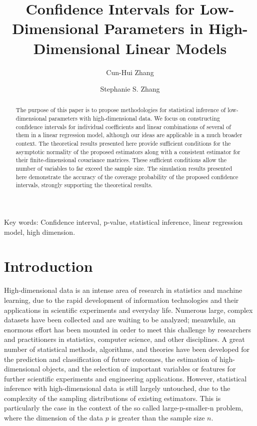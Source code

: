 \documentclass[11pt]{amsart}
\begin{document}
\title{Confidence Intervals for Low-Dimensional Parameters in High-Dimensional Linear Models} %
\author{Cun-Hui Zhang}
\address{Department of Statistics and Biostatistics, Hill Center, Busch Campus, 
Rutgers University, Piscataway, NJ 08854, USA}
\author{Stephanie S. Zhang}\address{Department of Statistics, Columbia University, 
New York, NY 10027}

\begin{abstract}
The purpose of this paper is to propose methodologies for statistical inference of low-dimensional 
parameters with high-dimensional data.  We focus on constructing confidence intervals for 
individual coefficients and linear combinations of several of them in a linear regression model, although 
our ideas are applicable in a much broader context. The theoretical results presented here provide 
sufficient conditions for the asymptotic normality of the proposed estimators along with a
consistent estimator for their finite-dimensional covariance matrices. These sufficient conditions 
allow the number of variables to far exceed the sample size.  The simulation results 
presented here demonstrate the accuracy of the coverage probability of the proposed confidence 
intervals, strongly supporting the theoretical results.
\end{abstract}

\maketitle
\thispagestyle{empty}

Key words: Confidence interval, p-value, statistical inference, linear regression model, high dimension. 

\section{Introduction}
High-dimensional data is an intense area of research in statistics and machine learning, 
due to the rapid development of information technologies and their applications in scientific 
experiments and everyday life.  Numerous large, complex datasets have been collected and 
are waiting to be analyzed; meanwhile, an enormous effort has been mounted in order to meet 
this challenge by researchers and practitioners in statistics, computer science, and other disciplines. 
A great number of statistical methods, algorithms, and theories 
have been developed for the prediction and classification of future outcomes, 
the estimation of high-dimensional objects, 
and the selection of important variables or features for further scientific experiments and engineering applications. 
However, statistical inference with high-dimensional data is still 
largely untouched, due to the complexity of the sampling distributions of existing estimators. 
This is particularly the case in the context of the so called large-p-smaller-n problem, where 
the dimension of the data $p$ is greater than the sample size $n$. 
\end{document}
